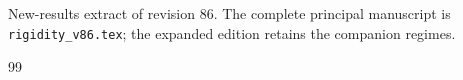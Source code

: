 
\begin{center}\small
New-results extract of revision 86. The complete principal manuscript is
\texttt{rigidity\_v86.tex}; the expanded edition retains the companion regimes.
\end{center}

\begin{thebibliography}{99}


\end{thebibliography}

